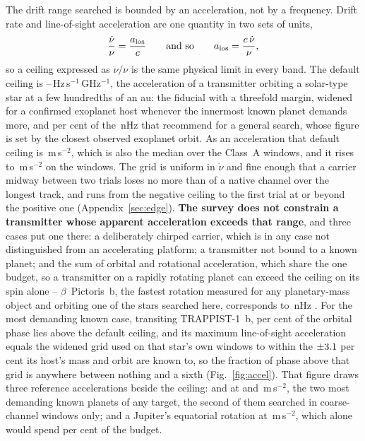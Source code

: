 The drift range searched is bounded by an acceleration, not by a
frequency. Drift rate and line-of-sight acceleration are one quantity in
two sets of units,
%
\begin{equation}
\frac{\dot\nu}{\nu}=\frac{a_{\rm los}}{c}
\qquad\text{and so}\qquad
a_{\rm los}=\frac{c\,\dot\nu}{\nu},
\label{eq:accel}
\end{equation}
%
so a ceiling expressed as $\dot\nu/\nu$ is the same physical limit in
every band. The default ceiling is
\DriftCeilLo--\DriftCeilHi\,Hz\,s$^{-1}$\,GHz$^{-1}$, the acceleration of a
transmitter orbiting a solar-type star at a few hundredths of an au: the
\citet{Mason2025} fiducial with a threefold margin, widened for a confirmed
exoplanet host whenever the innermost known planet demands more, and
\AccelSheikhPct{} per cent of the \AccelSheikhNHz\,nHz that
\citet{Sheikh2019} recommend for a general search, whose figure is set by the
closest observed exoplanet orbit. As an acceleration that default ceiling is
\AccelCeilMed\,m\,s$^{-2}$, which is also the median over the Class~A
windows, and it rises to \AccelCeilMax\,m\,s$^{-2}$ on the \AccelNWide{}
\AccelWideStar{} windows. The grid is uniform in $\dot\nu$ and fine
enough that a carrier midway between two trials loses no more than
\DriftGridFineHalf{} of a native channel over the longest track, and runs
from the negative ceiling to the first trial at or beyond the positive one
(Appendix~\ref{sec:edge}).
\textbf{The survey does not constrain a transmitter whose apparent
acceleration exceeds that range}, and three cases put one there: a
deliberately chirped carrier, which is in any case not distinguished from an
accelerating platform; a transmitter not bound to a known planet; and the
sum of orbital and rotational acceleration, which share the one budget, so a
transmitter on a rapidly rotating planet can exceed the ceiling on its spin
alone -- $\beta$~Pictoris~b, the fastest rotation measured for any
planetary-mass object and orbiting one of the stars searched here,
corresponds to \AccelBpicRotNHz\,nHz \citep{Sheikh2019}. For the most
demanding known case, transiting TRAPPIST-1~b, \TrapPhaseHi{} per cent of the
orbital phase lies above the default ceiling, and its maximum line-of-sight
acceleration equals the widened grid used on that star's own windows to
within the $\pm3.1$ per cent its host's mass and orbit are known to,
so the fraction of phase above that grid is anywhere between nothing and a
sixth (Fig.~\ref{fig:accel}). That figure draws three reference accelerations
beside the ceiling: \AccelWorstName{} and \AccelSecondName{} at
\AccelWorstVal{} and \AccelSecondVal\,m\,s$^{-2}$, the two most demanding
known planets of any target, the second of them searched in coarse-channel
windows only; and a Jupiter's equatorial rotation at
\AccelJupRot\,m\,s$^{-2}$, which alone would spend \AccelJupPct{} per cent of
the budget.

